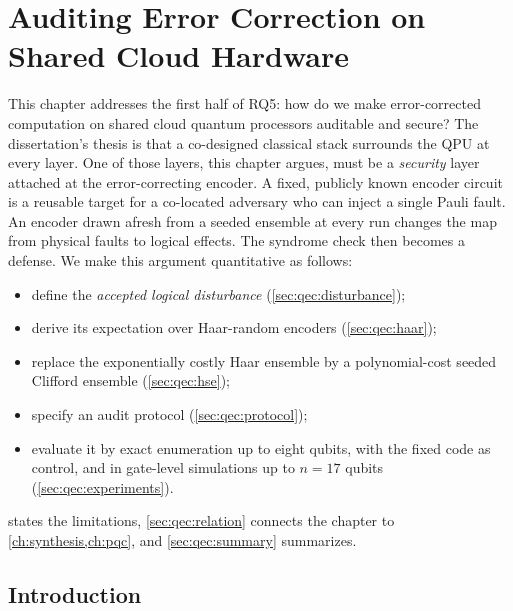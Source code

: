 \chapter{Auditing Error Correction on Shared Cloud Hardware}\label{ch:qec}

This chapter addresses the first half of RQ5: how do we make error-corrected computation on shared cloud quantum processors auditable and secure? The dissertation's thesis is that a co-designed classical stack surrounds the QPU at every layer. One of those layers, this chapter argues, must be a \emph{security} layer attached at the error-correcting encoder. A fixed, publicly known encoder circuit is a reusable target for a co-located adversary who can inject a single Pauli fault. An encoder drawn afresh from a seeded ensemble at every run changes the map from physical faults to logical effects. The syndrome check then becomes a defense. We make this argument quantitative as follows:
\begin{itemize}
  \item define the \emph{accepted logical disturbance} (\cref{sec:qec:disturbance});
  \item derive its expectation over Haar-random encoders (\cref{sec:qec:haar});
  \item replace the exponentially costly Haar ensemble by a polynomial-cost seeded Clifford ensemble (\cref{sec:qec:hse});
  \item specify an audit protocol (\cref{sec:qec:protocol});
  \item evaluate it by exact enumeration up to eight qubits, with the fixed  code as control, and in gate-level simulations up to $n=17$ qubits (\cref{sec:qec:experiments}).
\end{itemize}
 states the limitations, \cref{sec:qec:relation} connects the chapter to \cref{ch:synthesis,ch:pqc}, and \cref{sec:qec:summary} summarizes.

\section{Introduction}\label{sec:qec:intro}

